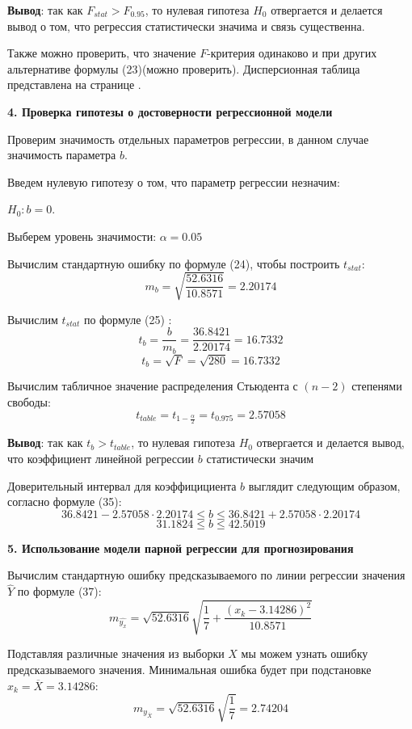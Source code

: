 \documentclass[aps,%
12pt,%
final,%
oneside,
onecolumn,%
musixtex, %
superscriptaddress,%
centertags]{article} %
\begin{document}
\textbf{Вывод}: так как $F_{stat}  > F_{0.95} $, то нулевая гипотеза $H_0$ отвергается и делается вывод о том, что регрессия статистически значима и связь существенна.

Также можно проверить, что значение $F$-критерия одинаково и при других альтернативе формулы (23)(можно проверить). Дисперсионная таблица представлена на странице \pageref{first_table_analiz}.

\begin{center}
\textbf{4. Проверка гипотезы о достоверности регрессионной модели} 
\end{center}

Проверим значимость отдельных параметров регрессии, в данном случае значимость параметра $b$.

Введем нулевую гипотезу о том, что параметр регрессии незначим:
\begin{center} $H_0: b=0$. \end{center}

Выберем уровень значимости: $\alpha = 0.05$

Вычислим стандартную ошибку по формуле (24), чтобы построить $t_{stat}$:
$$ m_b = \sqrt { \frac{52.6316}{10.8571}} = 2.20174 $$

Вычислим $t_{stat}$ по формуле (25) :
$$t_b = \frac{b}{m_b} = \frac{36.8421}{2.20174} = 16.7332 $$
$$t_b = \sqrt {F} = \sqrt{280} = 16.7332 $$

Вычислим табличное значение распределения Стьюдента с $(n-2)$ степенями свободы:
$$ t_{table} = t_{1 - \frac{\alpha}{2}} = t_{0.975} = 2.57058$$  

\textbf{Вывод}: так как $t_b > t_{table}$, то нулевая гипотеза $H_0$ отвергается и делается вывод, что коэффициент линейной регрессии $b$ статистически значим

Доверительный интервал для коэффицициента $b$ выглядит следующим образом, согласно формуле (35):
$$36.8421 - 2.57058 \cdot 2.20174 \leq b \leq 36.8421 + 2.57058 \cdot 2.20174  $$
$$31.1824 \leq b \leq 42.5019 $$

\begin{center}
\textbf{5. Использование модели парной регрессии для прогнозирования} 
\end{center}

Вычислим стандартную ошибку предсказываемого по линии регрессии значения $\hat{Y}$ по формуле (37):
$$ m_{\widehat{y_x}} = \sqrt{52.6316} \sqrt{\frac{1}{7} + \frac{(x_k-3.14286)^2}{10.8571}} $$

Подставляя различные значения из выборки $X$ мы можем узнать ошибку предсказываемого значения. Минимальная ошибка будет при подстановке $x_k = \overline{X}=3.14286$:
$$ m_{y_{\overline{X}}} = \sqrt{52.6316} \sqrt{\frac{1}{7}} = 2.74204$$
\end{document}
